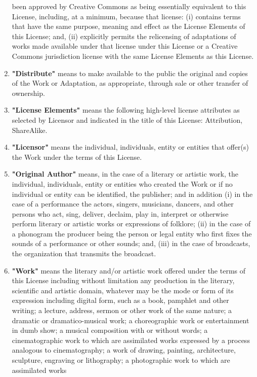 \begin{enumerate}
  been approved by Creative Commons as being essentially equivalent
  to this License, including, at a minimum, because that license: (i)
  contains terms that have the same purpose, meaning and effect as
  the License Elements of this License; and, (ii) explicitly permits
  the relicensing of adaptations of works made available under that
  license under this License or a Creative Commons jurisdiction
  license with the same License Elements as this License.
\item
  \textbf{"Distribute"} means to make available to the public the
  original and copies of the Work or Adaptation, as appropriate,
  through sale or other transfer of ownership.
\item
  \textbf{"License Elements"} means the following high-level license
  attributes as selected by Licensor and indicated in the title of
  this License: Attribution, ShareAlike.
\item
  \textbf{"Licensor"} means the individual, individuals, entity or
  entities that offer(s) the Work under the terms of this License.
\item
  \textbf{"Original Author"} means, in the case of a literary or
  artistic work, the individual, individuals, entity or entities who
  created the Work or if no individual or entity can be identified,
  the publisher; and in addition (i) in the case of a performance the
  actors, singers, musicians, dancers, and other persons who act,
  sing, deliver, declaim, play in, interpret or otherwise perform
  literary or artistic works or expressions of folklore; (ii) in the
  case of a phonogram the producer being the person or legal entity
  who first fixes the sounds of a performance or other sounds; and,
  (iii) in the case of broadcasts, the organization that transmits
  the broadcast.
\item
  \textbf{"Work"} means the literary and/or artistic work offered
  under the terms of this License including without limitation any
  production in the literary, scientific and artistic domain,
  whatever may be the mode or form of its expression including
  digital form, such as a book, pamphlet and other writing; a
  lecture, address, sermon or other work of the same nature; a
  dramatic or dramatico-musical work; a choreographic work or
  entertainment in dumb show; a musical composition with or without
  words; a cinematographic work to which are assimilated works
  expressed by a process analogous to cinematography; a work of
  drawing, painting, architecture, sculpture, engraving or
  lithography; a photographic work to which are assimilated works

\end{enumerate}
